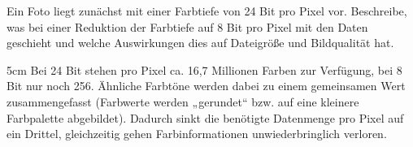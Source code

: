 
\question[3]
Ein Foto liegt zunächst mit einer Farbtiefe von 24 Bit pro Pixel vor. Beschreibe,
was bei einer Reduktion der Farbtiefe auf 8 Bit pro Pixel mit den Daten geschieht 
und welche Auswirkungen dies auf Dateigröße und Bildqualität hat.

\begin{solutionbox}{5cm}
Bei 24 Bit stehen pro Pixel ca. 16,7 Millionen Farben zur Verfügung, bei 8 Bit nur 
noch 256. Ähnliche Farbtöne werden dabei zu einem gemeinsamen Wert zusammengefasst 
(Farbwerte werden „gerundet“ bzw. auf eine kleinere Farbpalette abgebildet). 
Dadurch sinkt die benötigte Datenmenge pro Pixel auf ein Drittel, 
gleichzeitig gehen Farbinformationen unwiederbringlich verloren.
\end{solutionbox}
